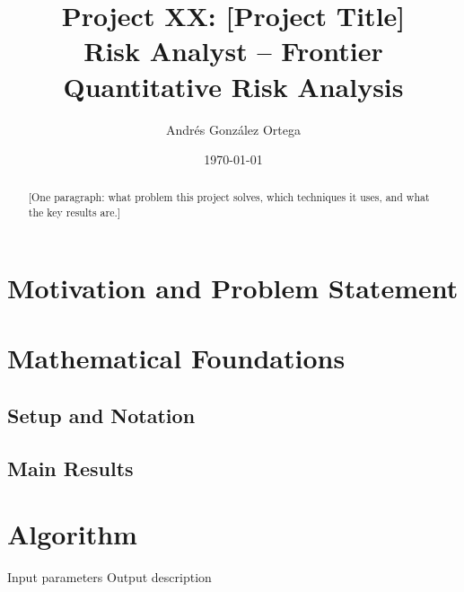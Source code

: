 \documentclass[11pt, a4paper]{article}
\title{%
    \textbf{Project XX: [Project Title]} \\[0.5em]
    \large Risk Analyst -- Frontier Quantitative Risk Analysis
}
\author{Andr\'es Gonz\'alez Ortega}
\date{\today}
\theoremstyle{definition}
\theoremstyle{plain}
\theoremstyle{remark}
\begin{document}
\maketitle

\begin{abstract}
    [One paragraph: what problem this project solves, which techniques it uses,
    and what the key results are.]
\end{abstract}

\tableofcontents
\newpage

\section{Motivation and Problem Statement}

\section{Mathematical Foundations}

\subsection{Setup and Notation}

\subsection{Main Results}

\begin{keyresult}
\end{keyresult}

\section{Algorithm}

\begin{algorithm}[H]
\caption{[Algorithm Name]}
\begin{algorithmic}[1]
    \Require Input parameters
    \Ensure Output description
    \State [Step 1]
    \State [Step 2]
    \Return [Result]
\end{algorithmic}
\end{algorithm}
\end{document}
